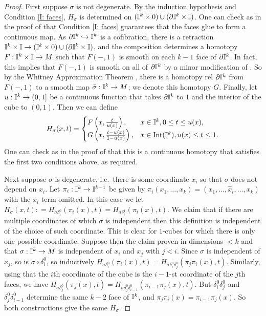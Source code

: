 \begin{proof}
First suppose $\sigma$ is not degenerate. By the induction hypothesis and Condition \eqref{I: faces}, $H_\sigma$ is determined on $(\mathbb{I}^k \times 0) \cup (\partial \mathbb{I}^k \times \mathbb{I})$. One can check as in the proof of \cite[Lemma 18.8]{Lee13} that Condition \eqref{I: faces} guarantees that the faces glue to form a continuous map. As $\partial \mathbb{I}^k\hookrightarrow \mathbb{I}^k$ is a cofibration, there is a retraction $\mathbb{I}^k\times\mathbb{I} \to (\mathbb{I}^k \times 0) \cup (\partial \mathbb{I}^k \times \mathbb{I})$, and the composition determines a homotopy $F:\mathbb{I}^k\times\mathbb{I} \to M$ such that $F(-,1)$ is smooth on each $k-1$ face of $\partial \mathbb{I}^k$. In fact, this implies that $F(-,1)$ is smooth on all of $\partial \mathbb{I}^k$ by a minor modification of \cite[Lemma 18.9]{Lee13}. So by the Whitney Approximation Theorem \cite[Theorem 6.26]{Lee13}, there is a homotopy rel $\partial \mathbb{I}^k$ from $F(-,1)$ to a smooth map $\tilde \sigma:\mathbb{I}^k \to M$; we denote this homotopy $G$. Finally, let $u:\mathbb{I}^k \to (0,1]$ be a continuous function that takes $\partial\mathbb{I}^k$ to $1$ and the interior of the cube to $(0,1)$. Then we can define
\begin{equation*}
H_\sigma(x,t) =
\begin{cases}
F\left(x,\frac{t}{u(x)}\right),&x \in \mathbb{I}^k, 0\leq t\leq u(x),\\
G\left(x,\frac{t-u(x)}{1-u(x)}\right),&x \in \text{Int}(\mathbb{I}^k), u(x)\leq t\leq 1.\\
\end{cases}
\end{equation*}
One can check as in the proof of \cite[Lemma 18.8]{Lee13} that this is a continuous homotopy that satisfies the first two conditions above, as required.

Next suppose $\sigma$ is degenerate, i.e.\ there is some coordinate $x_i$ so that $\sigma$ does not depend on $x_i$. Let $\pi_i:\mathbb{I}^k\to\mathbb{I}^{k-1}$ be given by $\pi_i(x_1,\ldots, x_k) = (x_1,\ldots, \hat x_i, \ldots, x_k)$ with the $x_i$ term omitted. In this case we let $H_\sigma(x,t): = H_{\sigma \delta_i^0}(\pi_i(x),t) = H_{\sigma \delta_i^1}(\pi_i(x),t)$.
 We claim that if there are multiple coordinates of which $\sigma$ is independent then this definition is independent of the choice of such coordinate. This is clear for $1$-cubes for which there is only one possible coordinate. Suppose then the claim proven in dimensions $<k$ and that $\sigma:\mathbb{I}^k \to M$ is independent of $x_i$ and $x_j$ with $j<i$. Since $\sigma$ is independent of $x_j$, so is $\sigma\circ \delta_i^0$, so inductively $H_{\sigma \delta_i^0}(\pi_i(x),t) = H_{\sigma \delta_i^0\delta_j^0}(\pi_j\pi_i(x),t)$. Similarly, using that the $i$th coordinate of the cube is the $i-1$-st coordinate of the $j$th faces, we have $H_{\sigma \delta_j^0}(\pi_j(x),t) = H_{\sigma \delta_j^0\delta_{i-1}^0}(\pi_{i-1}\pi_j(x),t)$. But $\delta_i^0\delta_j^0$ and $\delta_j^0\delta_{i-1}^0$ determine the same $k-2$ face of $\mathbb{I}^k$, and $\pi_j\pi_i(x) = \pi_{i-1}\pi_j(x)$. So both constructions give the same $H_\sigma$.


\end{proof}
